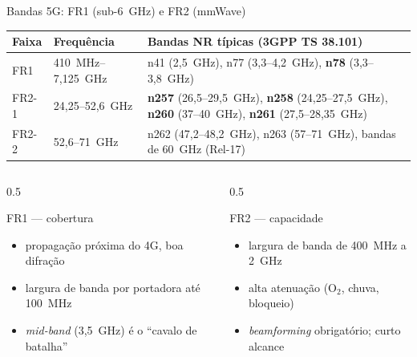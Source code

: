 \documentclass[aspectratio=169,11pt]{beamer}
\begin{document}
\begin{frame}{Bandas 5G: FR1 (sub-6~GHz) e FR2 (mmWave)}
  \begin{center}
    \scriptsize
    \begin{tabular}{@{}p{1.5cm}p{3.3cm}p{7.4cm}@{}}
      \toprule
      \textbf{Faixa} & \textbf{Frequência} & \textbf{Bandas NR típicas (3GPP TS 38.101)}\\
      \midrule
      FR1 & 410~MHz--7,125~GHz & n41 (2,5~GHz), n77 (3,3--4,2~GHz), \textbf{n78} (3,3--3,8~GHz)\\
      FR2-1 & 24,25--52,6~GHz & \textbf{n257} (26,5--29,5~GHz), \textbf{n258} (24,25--27,5~GHz), \textbf{n260} (37--40~GHz), \textbf{n261} (27,5--28,35~GHz)\\
      FR2-2 & 52,6--71~GHz & n262 (47,2--48,2~GHz), n263 (57--71~GHz), bandas de 60~GHz (Rel-17)\\
      \bottomrule
    \end{tabular}
  \end{center}
  \begin{columns}
    \begin{column}{0.5\textwidth}
      \begin{block}{FR1 --- cobertura}
        \begin{itemize}
          \item propagação próxima do 4G, boa difração
          \item largura de banda por portadora até 100~MHz
          \item \emph{mid-band} (3,5~GHz) é o ``cavalo de batalha''
        \end{itemize}
      \end{block}
    \end{column}
    \begin{column}{0.5\textwidth}
      \begin{alertblock}{FR2 --- capacidade}
        \begin{itemize}
          \item largura de banda de 400~MHz a 2~GHz
          \item alta atenuação (O$_2$, chuva, bloqueio)
          \item \emph{beamforming} obrigatório; curto alcance
        \end{itemize}
      \end{alertblock}
    \end{column}
  \end{columns}
\end{frame}
\end{document}

